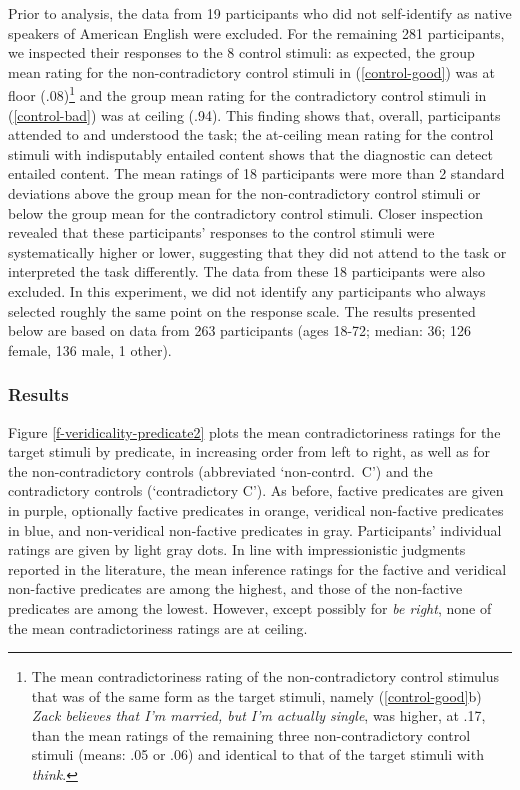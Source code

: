 \documentclass[11pt,fleqn]{article}
\newcommand{\6}{\mbox{$[\hspace*{-.6mm}[$}}
\newcommand{\9}{\mbox{$]\hspace*{-.6mm}]$}}
\begin{document}
{Prior to analysis, the data from 19 participants who did not self-identify as native speakers of American English were excluded. For the remaining 281 participants, we inspected their responses to the 8 control stimuli: as expected, the group mean rating for the non-contradictory control stimuli in (\ref{control-good}) was at floor (.08)\footnote{The mean contradictoriness rating of the non-contradictory control stimulus that was of the same form as the target stimuli, namely (\ref{control-good}b) {\em Zack believes that I'm married, but I'm actually single}, was higher, at .17, than the mean ratings of the remaining three non-contradictory control stimuli (means: .05 or .06) and identical to that of the target stimuli with {\em think}.}  and the group mean rating for the contradictory control stimuli in (\ref{control-bad}) was at ceiling (.94). This finding shows that, overall, participants attended to and understood the task; the at-ceiling mean rating for the control stimuli with indisputably entailed content shows that the diagnostic can detect entailed content. The mean ratings of 18 participants were more than 2 standard deviations above the group mean for the non-contradictory control stimuli or below the group mean for the contradictory control stimuli. Closer inspection revealed that these participants' responses to the control stimuli were systematically higher or lower, suggesting that they did not attend to the task or interpreted the task differently. The data from these 18 participants were also excluded. In this experiment, we did not identify any participants who always selected roughly the same point on the response scale. The results presented below are based on data from 263 participants (ages 18-72; median: 36; 126 female, 136 male, 1 other).

\subsubsection{Results}


Figure \ref{f-veridicality-predicate2} plots the mean contradictoriness ratings for the target stimuli by predicate, in increasing order from left to right, as well as for the non-contradictory controls (abbreviated `non-contrd.\ C')  and  the contradictory controls (`contradictory C'). As before, factive predicates are given in purple, optionally factive predicates in orange, veridical non-factive predicates in blue, and non-veridical non-factive predicates in gray. Participants' individual ratings are given by light gray dots. In line with impressionistic judgments reported in the literature, the mean inference ratings for the factive and veridical non-factive predicates are among the highest, and those of the non-factive predicates are among the lowest. However, except possibly for {\em be right}, none of the mean contradictoriness ratings are at ceiling.

}
\end{document}
